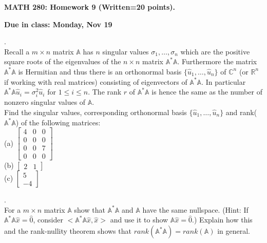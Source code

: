 \documentclass[12 pt]{article}
\begin{document}
\centerline{\bf MATH 280: Homework 9 (Written=20 points). }
\centerline{\bf Due in class: Monday, Nov 19}

\bigskip

. \\ Recall a $m \times n$ matrix $\mathbb{A}$ has $n$ singular values $\sigma_1, \dots, \sigma_n$ which are the 
positive square roots of the eigenvalues of the $n \times n$ matrix $\mathbb{A}^* \mathbb{A}$. Furthermore the matrix $\mathbb{A}^* \mathbb{A}$ is Hermitian and thus there 
is an orthonormal basis $\{ \hat{u}_1, \dots, \hat{u}_n \}$ of $\mathbb{C}^n$ (or $\mathbb{R}^n$ if working with real matrices) consisting of eigenvectors of $\mathbb{A}^*\mathbb{A}$. In particular $\mathbb{A}^*\mathbb{A} \hat{u}_i = \sigma_i^2 \hat{u}_i$ for $1 \leq i \leq n$. The rank $r$ of $\mathbb{A}^* \mathbb{A}$ 
is hence the same as the number of nonzero singular values of $\mathbb{A}$. \\
Find the singular values, corresponding orthonormal basis $\{ \hat{u}_1, \dots, \hat{u}_n \}$ and rank($\mathbb{A}^*\mathbb{A}$) of the following matrices: \\
(a) $\begin{bmatrix} 4 & 0 & 0 \\ 0 & 0 & 0 \\ 0 & 0 & 7 \\ 0 & 0 & 0 \end{bmatrix} $\\

\noindent
(b) $\begin{bmatrix} 2 & 1 \end{bmatrix}$ \\

\noindent
(c) $\begin{bmatrix} 5 \\ - 4 \end{bmatrix} $


\medskip

. \\ For a $m \times n$ matrix $\mathbb{A}$ show that $\mathbb{A}^*\mathbb{A}$ and $\mathbb{A}$ have the same nullspace.
(Hint: If $\mathbb{A}^*\mathbb{A}\hat{x}=\hat{0}$, consider $<\mathbb{A}^*\mathbb{A}\hat{x}, \hat{x}>$ and use it to show 
$\mathbb{A}\hat{x}=\hat{0}$.) Explain how this and the rank-nullity theorem shows that $rank(\mathbb{A}^*\mathbb{A})=rank(\mathbb{A})$ in general.

\medskip
\end{document}
